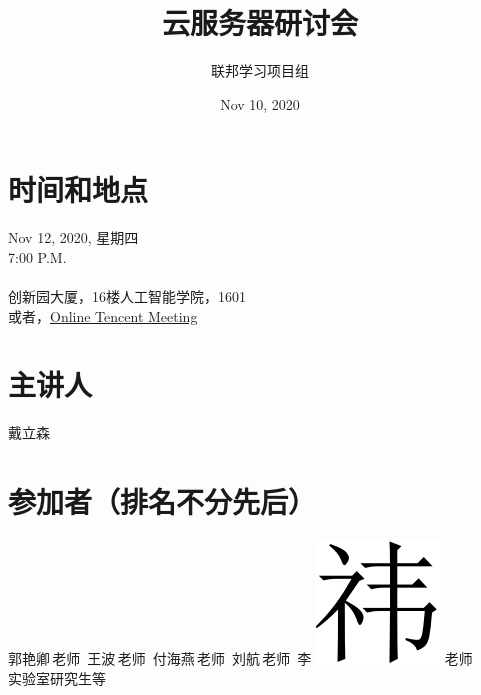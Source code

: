 \documentclass[12pt]{article}
\title{
    {云服务器研讨会}
}
\date{Nov 10, 2020}
\author{联邦学习项目组}
\begin{document}
    \maketitle

    \section*{时间和地点}
        \begin{center}
            {\large Nov 12, 2020, 星期四} \\
            {\normalsize 7:00 P.M.} \\ 
            \hspace*{\fill} \\
            {\large 创新园大厦，16楼人工智能学院，1601} \\
            {\small 或者，\href{https://meeting.tencent.com/s/5A5VOzWXucmi}{Online Tencent Meeting}} \\

        \end{center}
        
    \section*{主讲人}
        \begin{center}
            戴立森
        \end{center}

    \section*{参加者（排名不分先后）}
        \begin{center}
            郭艳卿\,老师\ 王波\,老师\ 付海燕\,老师\ 刘航\,老师\ 李
            \includegraphics[scale=0.15]{scr/img/yi.jpg}
            老师\\
            实验室研究生\quad 等 
        \end{center}
\end{document}
